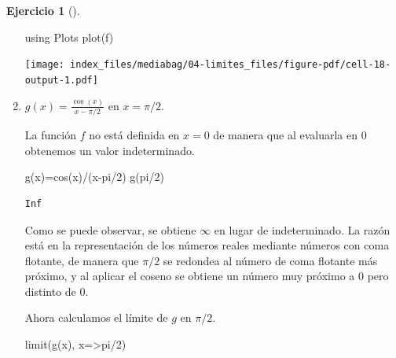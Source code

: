 \documentclass[
  a4paper,
]{scrreport}
\newenvironment{Shaded}{\begin{snugshade}}{\end{snugshade}}
\newcommand{\BuiltInTok}[1]{\textcolor[rgb]{0.00,0.23,0.31}{#1}}
\newcommand{\ConstantTok}[1]{\textcolor[rgb]{0.56,0.35,0.01}{#1}}
\newcommand{\FloatTok}[1]{\textcolor[rgb]{0.68,0.00,0.00}{#1}}
\newcommand{\FunctionTok}[1]{\textcolor[rgb]{0.28,0.35,0.67}{#1}}
\newcommand{\ImportTok}[1]{\textcolor[rgb]{0.00,0.46,0.62}{#1}}
\newcommand{\NormalTok}[1]{\textcolor[rgb]{0.00,0.23,0.31}{#1}}
\newcommand{\OperatorTok}[1]{\textcolor[rgb]{0.37,0.37,0.37}{#1}}
\theoremstyle{definition}
\newtheorem{exercise}{Ejercicio}[chapter]
\theoremstyle{remark}
\begin{document}
\begin{exercise}[]
\begin{enumerate}
\begin{tcolorbox}
\begin{Shaded}
\begin{Highlighting}[]
\ImportTok{using} \BuiltInTok{Plots}
\FunctionTok{plot}\NormalTok{(f)}
\end{Highlighting}
\end{Shaded}

  \texttt{[image: index\_files/mediabag/04-limites\_files/figure-pdf/cell-18-output-1.pdf]}

  \end{tcolorbox}
\item
  \(g(x)=\frac{\cos(x)}{x-\pi/2}\) en \(x=\pi/2\).

  \begin{tcolorbox}[enhanced jigsaw, bottomtitle=1mm, rightrule=.15mm, left=2mm, colback=white, title=\textcolor{quarto-callout-tip-color}{\faLightbulb}\hspace{0.5em}{Solución}, bottomrule=.15mm, colframe=quarto-callout-tip-color-frame, toprule=.15mm, leftrule=.75mm, opacityback=0, coltitle=black, breakable, colbacktitle=quarto-callout-tip-color!10!white, arc=.35mm, toptitle=1mm, titlerule=0mm, opacitybacktitle=0.6]

  La función \(f\) no está definida en \(x=0\) de manera que al
  evaluarla en \(0\) obtenemos un valor indeterminado.

\begin{Shaded}
\begin{Highlighting}[]
\FunctionTok{g}\NormalTok{(x)}\OperatorTok{=}\FunctionTok{cos}\NormalTok{(x)}\OperatorTok{/}\NormalTok{(x}\OperatorTok{{-}}\ConstantTok{pi}\OperatorTok{/}\FloatTok{2}\NormalTok{)}
\FunctionTok{g}\NormalTok{(}\ConstantTok{pi}\OperatorTok{/}\FloatTok{2}\NormalTok{)}
\end{Highlighting}
\end{Shaded}

\begin{verbatim}
Inf
\end{verbatim}

  Como se puede observar, se obtiene \(\infty\) en lugar de
  indeterminado. La razón está en la representación de los números
  reales mediante números con coma flotante, de manera que \(\pi/2\) se
  redondea al número de coma flotante más próximo, y al aplicar el
  coseno se obtiene un número muy próximo a \(0\) pero distinto de
  \(0\).

  Ahora calculamos el límite de \(g\) en \(\pi/2\).

\begin{Shaded}
\begin{Highlighting}[]
\FunctionTok{limit}\NormalTok{(}\FunctionTok{g}\NormalTok{(x), x}\OperatorTok{=\textgreater{}}\ConstantTok{pi}\OperatorTok{/}\FloatTok{2}\NormalTok{)}
\end{Highlighting}
\end{Shaded}


\end{tcolorbox}
\end{enumerate}
\end{exercise}
\end{document}
